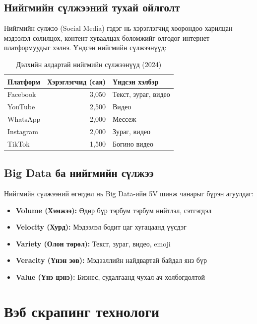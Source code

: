 \documentclass[12pt,a4paper]{report}
\begin{document}
\subsection{Нийгмийн сүлжээний тухай ойлголт}

Нийгмийн сүлжээ (Social Media) гэдэг нь хэрэглэгчид хоорондоо харилцан мэдээлэл солилцох, контент хуваалцах боломжийг олгодог интернет платформуудыг хэлнэ. Үндсэн нийгмийн сүлжээнүүд:

\begin{table}[H]
\centering
\caption{Дэлхийн алдартай нийгмийн сүлжээнүүд (2024)}
\begin{tabular}{|l|r|l|}
\hline
\textbf{Платформ} & \textbf{Хэрэглэгчид (сая)} & \textbf{Үндсэн хэлбэр} \\
\hline
Facebook & 3,050 & Текст, зураг, видео \\
YouTube & 2,500 & Видео \\
WhatsApp & 2,000 & Мессеж \\
Instagram & 2,000 & Зураг, видео \\
TikTok & 1,500 & Богино видео \\
\hline
\end{tabular}
\end{table}

\subsection{Big Data ба нийгмийн сүлжээ}

Нийгмийн сүлжээний өгөгдөл нь Big Data-ийн 5V шинж чанарыг бүрэн агуулдаг:

\begin{itemize}
    \item \textbf{Volume (Хэмжээ):} Өдөр бүр тэрбум тэрбум нийтлэл, сэтгэгдэл
    \item \textbf{Velocity (Хурд):} Мэдээлэл бодит цаг хугацаанд үүсдэг
    \item \textbf{Variety (Олон төрөл):} Текст, зураг, видео, emoji
    \item \textbf{Veracity (Үнэн зөв):} Мэдээллийн найдвартай байдал янз бүр
    \item \textbf{Value (Үнэ цэнэ):} Бизнес, судалгаанд чухал ач холбогдолтой
\end{itemize}

\section{Вэб скрапинг технологи}
\end{document}
